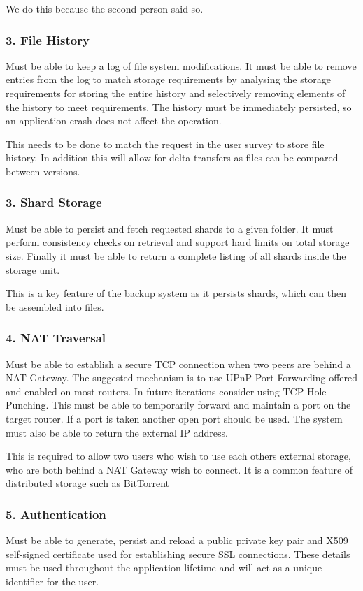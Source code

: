 \documentclass[a4paper, 11pt, twocolumn, twoside]{report}
\begin{document}
We do this because the second person said so. 

\subsubsection{3. File History}
Must be able to keep a log of file system modifications. It must be able to remove entries from the log to match storage requirements by analysing the storage requirements for storing the entire history and selectively removing elements of the history to meet requirements. The history must be immediately persisted, so an application crash does not affect the operation.

This needs to be done to match the request in the user survey to store file history. In addition this will allow for delta transfers as files can be compared between versions.

\subsubsection{3. Shard Storage}
Must be able to persist and fetch requested shards to a given folder. It must perform consistency checks on retrieval and support hard limits on total storage size. Finally it must be able to return a complete listing of all shards inside the storage unit.

This is a key feature of the backup system as it persists shards, which can then be assembled into files.

\subsubsection{4. NAT Traversal}
Must be able to establish a secure TCP connection when two peers are behind a NAT Gateway. The suggested mechanism is to use UPnP Port Forwarding offered and enabled on most routers. In future iterations consider using TCP Hole Punching. This must be able to temporarily forward and maintain a port on the target router. If a port is taken another open port should be used. The system must also be able to return the external IP address.

This is required to allow two users who wish to use each others external storage, who are both behind a NAT Gateway wish to connect. It is a common feature of distributed storage such as BitTorrent

\subsubsection{5. Authentication}
Must be able to generate, persist and reload a public private key pair and X509 self-signed certificate used for establishing secure SSL connections. These details must be used throughout the application lifetime and will act as a unique identifier for the user.
\end{document}
